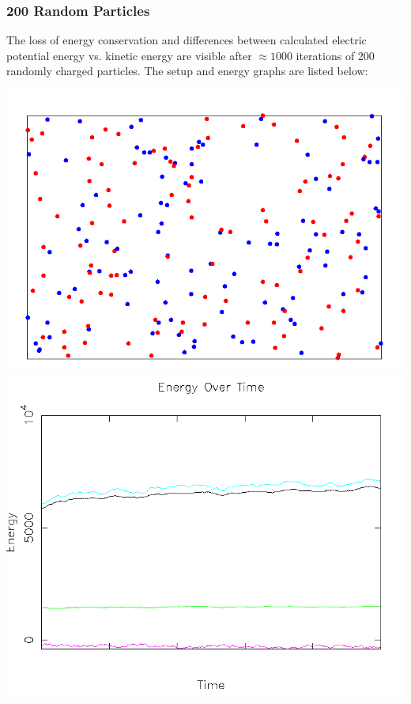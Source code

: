 \documentclass{article}
\begin{document}
\subsubsection{200 Random Particles}
The loss of energy conservation and differences between calculated electric potential energy
vs. kinetic energy are visible after $\approx 1000$ iterations of 200 randomly charged particles.
The setup and energy graphs are listed below:
\\
\begin{center}
    \includegraphics[scale=0.5]{charged_random}
    \includegraphics[scale=0.5]{charged_random_energy}
\end{center}
\end{document}
